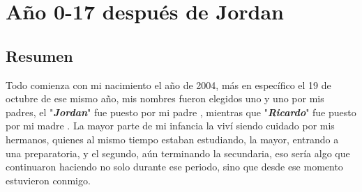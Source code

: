 \documentclass[letterpaper, 12pt]{article}
\begin{document}
    
\section*{Año 0-17 después de Jordan}

    \subsection*{Resumen}
    
    
    
    Todo comienza con mi nacimiento el año de 2004, más en específico el 19 de octubre de ese mismo año, mis nombres fueron elegidos uno y uno por mis padres, el "{\textbf{\textit{Jordan}}}" fue puesto por mi padre%
    , mientras que "{\textbf{\textit{Ricardo}}}" fue puesto por mi madre %
    . La mayor parte de mi infancia la viví siendo cuidado por mis hermanos, quienes al mismo tiempo estaban estudiando, la mayor, entrando a una preparatoria, y el segundo, aún terminando la secundaria, eso sería algo que continuaron haciendo no solo durante ese periodo, sino que desde ese momento estuvieron conmigo.\\
    
\end{document}
